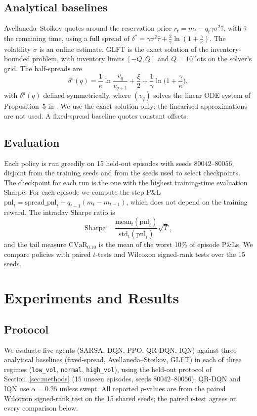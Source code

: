 \documentclass[10pt,twocolumn]{article}
\begin{document}
\subsection{Analytical baselines}
Avellaneda--Stoikov \citep{avellaneda2008} quotes around the reservation price $r_t=m_t-q_t\gamma\sigma^2\hat\tau$, with $\hat\tau$ the remaining time, using a full spread of $\delta^\ast=\gamma\sigma^2\hat\tau+\frac{2}{\gamma}\ln(1+\frac{\gamma}{\kappa})$. The volatility $\sigma$ is an online estimate. GLFT \citep{gueant2012} is the exact solution of the inventory-bounded problem, with inventory limits $[-Q,Q]$ and $Q=10$ lots on the solver's grid. The half-spreads are
\begin{equation}
  \delta^b(q)=\frac{1}{\kappa}\ln\frac{v_q}{v_{q+1}}+\frac{\xi}{2}+\frac{1}{\gamma}\ln\Big(1+\frac{\gamma}{\kappa}\Big),
\end{equation}
with $\delta^a(q)$ defined symmetrically, where $(v_q)$ solves the linear ODE system of Proposition~5 in \citep{gueant2012}. We use the exact solution only; the linearised approximations are not used. A fixed-spread baseline quotes constant offsets.

\subsection{Evaluation}
Each policy is run greedily on 15 held-out episodes with seeds $80042$--$80056$, disjoint from the training seeds and from the seeds used to select checkpoints. The checkpoint for each run is the one with the highest training-time evaluation Sharpe. For each episode we compute the step P\&L $\mathrm{pnl}_t=\mathrm{spread\_pnl}_t+q_{t-1}(m_t-m_{t-1})$, which does not depend on the training reward. The intraday Sharpe ratio is
\begin{equation}
  \mathrm{Sharpe}=\frac{\mathrm{mean}_t(\mathrm{pnl}_t)}{\mathrm{std}_t(\mathrm{pnl}_t)}\sqrt{T},
\end{equation}
and the tail measure $\mathrm{CVaR}_{0.10}$ is the mean of the worst 10\% of episode P\&Ls. We compare policies with paired $t$-tests and Wilcoxon signed-rank tests over the 15 seeds.

\section{Experiments and Results}
\label{sec:results}

\subsection{Protocol}
We evaluate five agents (SARSA, DQN, PPO, QR-DQN, IQN) against three analytical baselines (fixed-spread, Avellaneda--Stoikov, GLFT) in each of three regimes (\texttt{low\_vol}, \texttt{normal}, \texttt{high\_vol}), using the held-out protocol of Section~\ref{sec:methods} (15 unseen episodes, seeds $80042$--$80056$). QR-DQN and IQN use $\alpha=0.25$ unless swept. All reported $p$-values are from the paired Wilcoxon signed-rank test on the 15 shared seeds; the paired $t$-test agrees on every comparison below.
\end{document}
